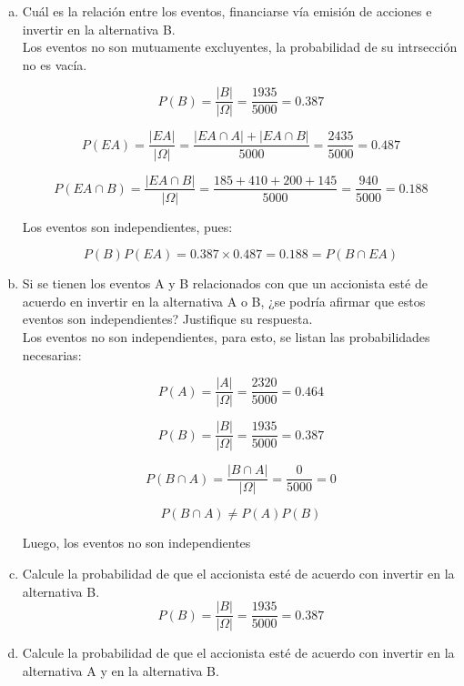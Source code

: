 \documentclass[11pt, spanish]{article}
\begin{document}
\begin{enumerate}[(a)]
\item Cuál es la relación entre los eventos, financiarse vía emisión de acciones e invertir en la alternativa B.\\

Los eventos no son mutuamente excluyentes, la probabilidad de su intrsección no es vacía.

$$P(B) = \frac{\left| B \right|}{\left| \Omega \right|} = \frac{1935}{5000} = 0.387$$

$$P(EA) = \frac{\left|  EA \right|}{\left| \Omega \right|} = \frac{\left|  EA \cap A \right| + \left|  EA \cap B \right|}{5000} = \frac{2435}{5000} = 0.487$$

$$P(EA \cap B) = \frac{\left|  EA \cap B \right|}{\left| \Omega \right|} = \frac{185 + 410 + 200 + 145}{5000} = \frac{940}{5000} = 0.188$$

Los eventos son independientes, pues:

$$P(B)P(EA) = 0.387 \times 0.487 = 0.188 = P(B \cap EA)$$

\item Si se tienen los eventos A y B relacionados con que un accionista esté de acuerdo en invertir en la alternativa A o B, ¿se podría afirmar que estos eventos son independientes? Justifique su respuesta.\\

Los eventos no son independientes, para esto, se listan las probabilidades necesarias:

$$P(A) = \frac{\left| A \right|}{\left| \Omega \right|} = \frac{2320}{5000} = 0.464$$

$$P(B) = \frac{\left| B \right|}{\left| \Omega \right|} = \frac{1935}{5000} = 0.387$$

$$P(B \cap A) = \frac{\left| B \cap A \right|}{\left| \Omega \right|} = \frac{0}{5000} = 0$$

$$P(B \cap A) \neq P(A)P(B)$$

Luego, los eventos no son independientes

\item Calcule la probabilidad de que el accionista esté de acuerdo con invertir en la alternativa B.\\

$$P(B) = \frac{\left| B \right|}{\left| \Omega \right|} = \frac{1935}{5000} = 0.387$$

\item Calcule la probabilidad de que el accionista esté de acuerdo con invertir en la alternativa A y en la alternativa B.\\


\end{enumerate}
\end{document}
